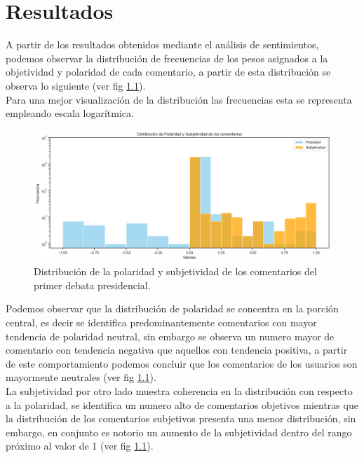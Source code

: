 \chapter{Resultados}

A partir de los resultados obtenidos mediante el análisis de sentimientos, podemos observar la distribución de frecuencias de los pesos asignados a la objetividad y polaridad de cada comentario, a partir de esta distribución se observa lo siguiente (ver fig \ref{fig:dpys}).\\

Para una mejor visualización de la distribución las frecuencias esta se representa empleando escala logarítmica.\\
 
\begin{figure}[!h]
	\centering
	\includegraphics[width=16cm]{../Datos/polaridadYsubjetividad}
	\caption[Distribución de polaridad y subjetividad]{Distribución de la polaridad y subjetividad de los comentarios del primer debata presidencial.}
	\label{fig:dpys}
\end{figure}

Podemos observar que la distribución de polaridad se concentra en la porción central, es decir se identifica predominantemente comentarios con mayor tendencia de polaridad neutral, sin embargo se observa un numero mayor de comentario con tendencia negativa que aquellos con tendencia positiva, a partir de este comportamiento podemos concluir que los comentarios de los usuarios son mayormente neutrales (ver fig \ref{fig:dpys}).\\

La subjetividad por otro lado muestra coherencia en la distribución con respecto a la polaridad, se identifica un numero alto de comentarios objetivos mientras que la distribución de los comentarios subjetivos presenta una menor distribución, sin embargo, en conjunto es notorio un aumento de la subjetividad dentro del rango próximo al valor de 1 (ver fig \ref{fig:dpys}).\\
\clearpage
 
